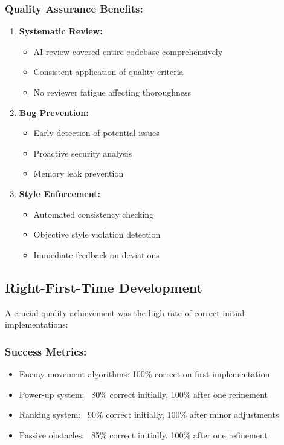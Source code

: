 \documentclass[12pt,a4paper]{article}
\begin{document}
\subsubsection*{Quality Assurance Benefits:}

\begin{enumerate}
    \item \textbf{Systematic Review:}
    \begin{itemize}
        \item AI review covered entire codebase comprehensively
        \item Consistent application of quality criteria
        \item No reviewer fatigue affecting thoroughness
    \end{itemize}
    
    \item \textbf{Bug Prevention:}
    \begin{itemize}
        \item Early detection of potential issues
        \item Proactive security analysis
        \item Memory leak prevention
    \end{itemize}
    
    \item \textbf{Style Enforcement:}
    \begin{itemize}
        \item Automated consistency checking
        \item Objective style violation detection
        \item Immediate feedback on deviations
    \end{itemize}
\end{enumerate}

\subsection{Right-First-Time Development}

A crucial quality achievement was the high rate of correct initial implementations:

\subsubsection*{Success Metrics:}
\begin{itemize}
    \item Enemy movement algorithms: 100\% correct on first implementation
    \item Power-up system: ~80\% correct initially, 100\% after one refinement
    \item Ranking system: ~90\% correct initially, 100\% after minor adjustments
    \item Passive obstacles: ~85\% correct initially, 100\% after one refinement
\end{itemize}
\end{document}
